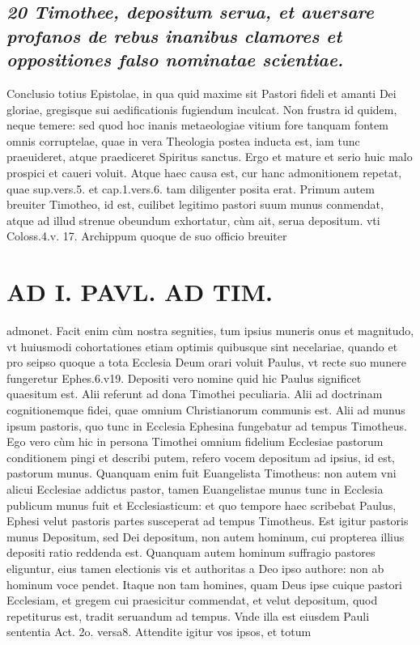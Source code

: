\documentclass{article}
\begin{document}
\begin{pages}
\subsection*{\textit{20 Timothee, depositum serua, et auersare profanos de rebus inanibus clamores et oppositiones falso nominatae scientiae. }}\pstart Conclusio totius Epistolae, in qua quid maxime sit Pastori fideli et amanti Dei gloriae, gregisque sui aedificationis fugiendum inculcat. Non frustra id quidem, neque temere: sed quod hoc inanis metaeologiae vitium fore tanquam fontem omnis corruptelae, quae in vera Theologia postea inducta est, iam tunc praeuideret, atque praediceret Spiritus sanctus. Ergo et mature et serio huic malo prospici et caueri voluit. Atque haec causa est, cur hanc admonitionem repetat, quae sup.vers.5. et cap.1.vers.6. tam diligenter posita erat. Primum autem breuiter Timotheo, id est, cuilibet legitimo pastori suum munus conmendat, atque ad illud strenue obeundum exhortatur, cùm ait, serua depositum. vti Coloss.4.v. 17. Archippum quoque de suo officio breuiter  \pend
\section*{AD I. PAVL. AD TIM. }
\marginpar{[ p.398 ]}\pstart admonet. Facit enim cùm nostra segnities, tum ipsius muneris onus et magnitudo, vt huiusmodi cohortationes etiam optimis quibusque sint necelariae, quando et pro seipso quoque a tota Ecclesia Deum orari voluit Paulus, vt recte suo munere fungeretur Ephes.6.v19. Depositi vero nomine quid hic Paulus significet quaesitum est. Alii referunt ad dona Timothei peculiaria. Alii ad doctrinam cognitionemque fidei, quae omnium Christianorum communis est. Alii ad munus ipsum pastoris, quo tunc in Ecclesia Ephesina fungebatur ad tempus Timotheus. Ego vero cùm hic in persona Timothei omnium fidelium Ecclesiae pastorum conditionem pingi et describi putem, refero vocem depositum ad ipsius, id est, pastorum munus. Quanquam enim fuit Euangelista Timotheus: non autem vni alicui Ecclesiae addictus pastor, tamen Euangelistae munus tunc in Ecclesia publicum munus fuit et Ecclesiasticum: et quo tempore haec scribebat Paulus, Ephesi velut pastoris partes susceperat ad tempus Timotheus. Est igitur pastoris munus Depositum, sed Dei depositum, non autem hominum, cui propterea illius depositi ratio reddenda est. Quanquam autem hominum suffragio pastores eliguntur, eius tamen electionis vis et authoritas a Deo ipso authore: non ab hominum voce pendet. Itaque non tam homines, quam Deus ipse cuique pastori Ecclesiam, et gregem cui praesicitur commendat, et velut depositum, quod repetiturus est, tradit seruandum ad tempus. Vnde illa est eiusdem Pauli sententia Act. 2o. versa8. Attendite igitur vos ipsos, et totum  \pend

\end{pages}
\end{document}
